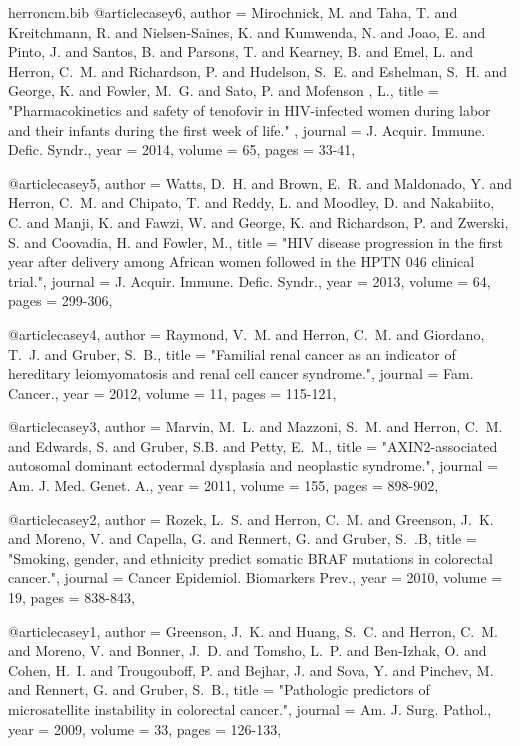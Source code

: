 \documentclass{res}
\begin{document}
\begin{resume}
\begin{filecontents}{herroncm.bib}
@article{casey6,
author = {{Mirochnick}, M. and {Taha}, T. and {Kreitchmann}, R. and {Nielsen-Saines}, K. and {Kumwenda}, N. and {Joao}, E. and {Pinto}, J. and {Santos}, B. and {Parsons}, T. and {Kearney}, B. and {Emel}, L. and {Herron}, C.~M. and {Richardson}, P. and {Hudelson}, S.~E. and {Eshelman}, S.~H. and {George}, K. and {Fowler}, M.~G. and {Sato}, P. and {Mofenson} , L.},
title = "{Pharmacokinetics and safety of tenofovir in HIV-infected women during labor and their infants during the first week of life.}" ,
journal = {J. Acquir. Immune. Defic. Syndr.},
year = 2014,
volume = 65,
pages = {33-41},
}

@article{casey5,
author = {{Watts}, D.~H. and {Brown}, E.~R. and {Maldonado}, Y. and {Herron}, C.~M. and {Chipato}, T. and {Reddy}, L. and {Moodley}, D. and {Nakabiito}, C. and {Manji}, K. and {Fawzi}, W. and {George}, K. and {Richardson}, P. and {Zwerski}, S. and {Coovadia}, H. and {Fowler}, M.}, 
title = "{HIV disease progression in the first year after delivery among African women followed in the HPTN 046 clinical trial.}",
journal = {J. Acquir. Immune. Defic. Syndr.},
year = 2013,
volume = 64,
pages = {299-306},
}

@article{casey4,
author = {{Raymond}, V.~M. and {Herron}, C.~M. and {Giordano}, T.~J. and {Gruber}, S.~B.},
title = "{Familial renal cancer as an indicator of hereditary leiomyomatosis and renal cell cancer syndrome.}",
journal = {Fam. Cancer.},
year = 2012,
volume = 11,
pages = {115-121},
}

@article{casey3,
author = {{Marvin}, M.~L. and {Mazzoni}, S.~M. and {Herron}, C.~M. and {Edwards}, S. and {Gruber}, S.B. and {Petty}, E.~M.},
title = "{AXIN2-associated autosomal dominant ectodermal dysplasia and neoplastic syndrome.}",
journal = {Am. J. Med. Genet. A.},
year = 2011,
volume = 155,
pages = {898-902},
}

@article{casey2,
author = {{Rozek}, L.~S. and {Herron}, C.~M. and {Greenson}, J.~K. and {Moreno}, V. and {Capella}, G. and {Rennert}, G. and {Gruber}, S.~.B},
title =  "{Smoking, gender, and ethnicity predict somatic BRAF mutations in colorectal cancer.}",
journal = {Cancer Epidemiol. Biomarkers Prev.},
year = 2010,
volume = 19,
pages = {838-843},
}

@article{casey1,
author = {{Greenson}, J.~K. and {Huang}, S.~C. and {Herron}, C.~M. and {Moreno}, V. and {Bonner}, J.~D. and {Tomsho}, L.~P. and {Ben-Izhak}, O. and {Cohen}, H.~I. and {Trougouboff}, P. and {Bejhar}, J. and {Sova}, Y. and {Pinchev}, M. and {Rennert}, G. and {Gruber}, S.~B.},
title =  "{Pathologic predictors of microsatellite instability in colorectal cancer.}",
journal = {Am. J. Surg. Pathol.},
year = 2009,
volume = 33,
pages = {126-133},
}
\end{filecontents}

\nocite{*}

\end{resume}
\end{document}

